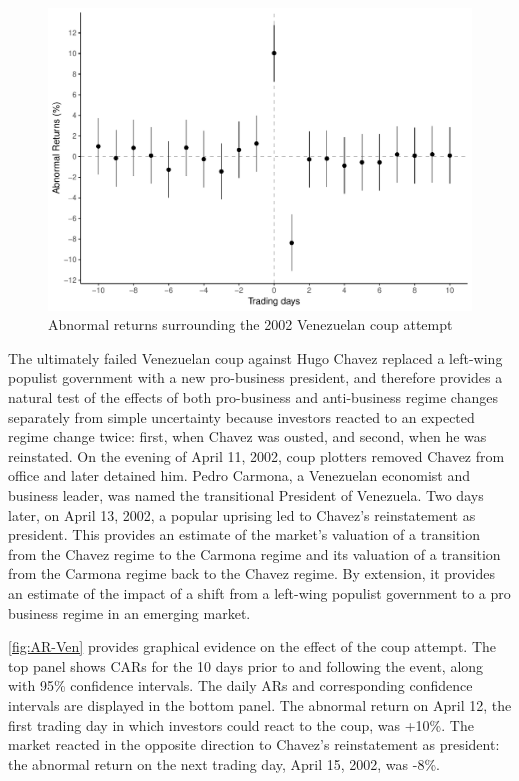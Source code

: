 \documentclass[12pt,final,fleqn]{article}
\theoremstyle{plain}
\begin{document}
\begin{figure}[!ht]
\includegraphics{../figs/venezuela_coup_attempt_2002.pdf}
\caption{Abnormal returns surrounding the 2002 Venezuelan coup attempt}
\label{fig:AR-Ven}
\end{figure}

The ultimately failed Venezuelan coup against Hugo Chavez replaced a left-wing populist government with a new pro-business president, and therefore provides a natural test of the effects of both pro-business and anti-business regime changes separately from simple uncertainty because investors reacted to an expected regime change twice: first, when Chavez was ousted, and second, when he was reinstated. On the evening of April 11, 2002, coup plotters removed Chavez from office and later detained him. Pedro Carmona, a Venezuelan economist and business leader, was named the transitional President of Venezuela. Two days later, on April 13, 2002, a popular uprising led to Chavez's reinstatement as president. This provides an estimate of the market's valuation of a transition from the Chavez regime to the Carmona regime and its valuation of a transition from the Carmona regime back to the Chavez regime. By extension, it provides an estimate of the impact of a shift from a left-wing populist government to a pro business regime in an emerging market. 

\autoref{fig:AR-Ven} provides graphical evidence on the effect of the coup attempt. The top panel shows CARs for the 10 days prior to and following the event, along with 95\% confidence intervals. The daily ARs and corresponding confidence intervals are displayed in the bottom panel. The abnormal return on April 12, the first trading day in which investors could react to the coup, was +10\%. The market reacted in the opposite direction to Chavez's reinstatement as president: the abnormal return on the next trading day, April 15, 2002, was -8\%. 
\end{document}
